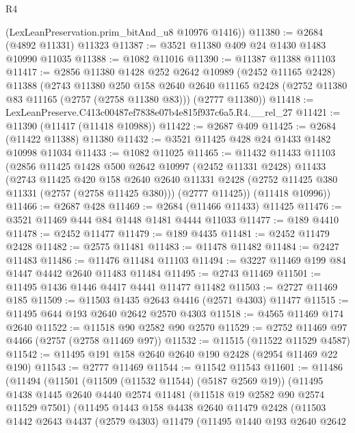 \begin{lexlean}{R4}
\begin{coremodule}
      (LexLeanPreservation.prim_bitAnd_u8 @10976 @1416))
@11380 := @2684 (@4892 @11331) @11323
@11387 := @3521 @11380 @409 @24 @1430 @1483 @10990 @11035
@11388 := @1082 @11016
@11390 := @11387 @11388 @11103
@11417 := @2856
    @11380
    @1428
    @252
    @2642
    @10989
    (@2452 @11165 @2428)
    @11388
    (@2743
      @11380
      @250
      @158
      @2640
      @2640
      @11165
      @2428
      (@2752 @11380 @83 @11165 (@2757 (@2758 @11380 @83)))
      (@2777 @11380))
@11418 := LexLeanPreserve.C413c00487ef7838e07b4e815f937c6a5.R4.__rel_27
@11421 := @11390 (@11417 (@11418 @10988))
@11422 := @2687 @409
@11425 := @2684 (@11422 @11388) @11380
@11432 := @3521 @11425 @428 @24 @1433 @1482 @10998 @11034
@11433 := @1082 @11025
@11465 := @11432
    @11433
    @11103
    (@2856
      @11425
      @1428
      @500
      @2642
      @10997
      (@2452 @11331 @2428)
      @11433
      (@2743
        @11425
        @420
        @158
        @2640
        @2640
        @11331
        @2428
        (@2752 @11425 @380 @11331 (@2757 (@2758 @11425 @380)))
        (@2777 @11425))
      (@11418 @10996))
@11466 := @2687 @428
@11469 := @2684 (@11466 @11433) @11425
@11476 := @3521 @11469 @444 @84 @1448 @1481 @4444 @11033
@11477 := @189 @4410
@11478 := @2452 @11477
@11479 := @189 @4435
@11481 := @2452 @11479 @2428
@11482 := @2575 @11481
@11483 := @11478 @11482
@11484 := @2427 @11483
@11486 := @11476 @11484 @11103
@11494 := @3227 @11469 @199 @84 @1447 @4442 @2640 @11483 @11484
@11495 := @2743 @11469
@11501 := @11495 @1436 @1446 @4417 @4441 @11477 @11482
@11503 := @2727 @11469 @185
@11509 := @11503 @1435 @2643 @4416 (@2571 @4303) @11477
@11515 := @11495 @644 @193 @2640 @2642 @2570 @4303
@11518 := @4565 @11469 @174 @2640
@11522 := @11518 @90 @2582 @90 @2570
@11529 := @2752 @11469 @97 @4466 (@2757 (@2758 @11469 @97))
@11532 := @11515 (@11522 @11529 @4587)
@11542 := @11495 @191 @158 @2640 @2640 @190 @2428 (@2954 @11469 @22 @190)
@11543 := @2777 @11469
@11544 := @11542 @11543
@11601 := @11486
    (@11494
      (@11501
        (@11509 (@11532 @11544) (@5187 @2569 @19))
        (@11495
          @1438
          @1445
          @2640
          @4440
          @2574
          @11481
          (@11518 @19 @2582 @90 @2574 @11529 @7501)
          (@11495
            @1443
            @158
            @4438
            @2640
            @11479
            @2428
            (@11503
              @1442
              @2643
              @4437
              (@2579 @4303)
              @11479
              (@11495
                @1440
                @193
                @2640
                @2642

\end{coremodule}
\end{lexlean}
